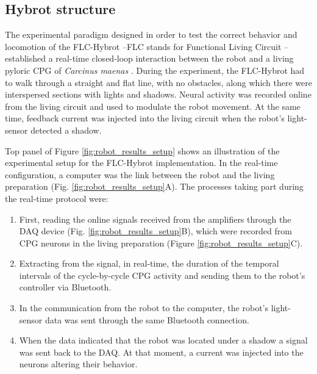 \subsection{Hybrot structure}
\label{sec:robot setup}
The experimental paradigm designed in order to test the correct behavior and locomotion of the FLC-Hybrot --FLC stands for Functional Living Circuit \parencite{soetard_dynamical_2023}-- established a real-time closed-loop interaction between the robot and a living pyloric CPG of \textit{Carcinus maenas} \parencite{elices_robust_2019}. During the experiment, the FLC-Hybrot had to walk through a straight and flat line, with no obstacles, along which there were interspersed sections with lights and shadows. Neural activity was recorded online from the living circuit and used to modulate the robot movement. At the same time, feedback current was injected into the living circuit when the robot's light-sensor detected a shadow.

Top panel of Figure \ref{fig:robot_results_setup} shows an illustration of the experimental setup for the FLC-Hybrot implementation. In the real-time configuration, a computer was the link between the robot and the living preparation (Fig. \ref{fig:robot_results_setup}A). The processes taking part during the real-time protocol were:
\begin{enumerate}
	\item First, reading the online signals received from the amplifiers through the DAQ device (Fig. \ref{fig:robot_results_setup}B), which were recorded from CPG neurons in the living preparation (Figure \ref{fig:robot_results_setup}C).
	\item Extracting from the signal, in real-time, the duration of the temporal intervals of the cycle-by-cycle CPG activity and sending them to the robot's controller via Bluetooth.
	\item In the communication from the robot to the computer, the robot's light-sensor data was sent through the same Bluetooth connection.
	\item When the data indicated that the robot was located under a shadow a signal was sent back to the DAQ. At that moment, a current was injected into the neurons altering their behavior.
\end{enumerate}

